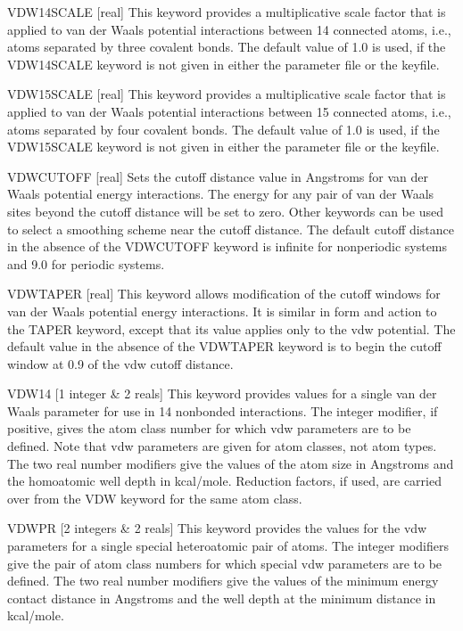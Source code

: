 \documentclass[letterpaper,11pt,english]{sphinxmanual}
\begin{document}
VDW\sphinxhyphen{}14\sphinxhyphen{}SCALE {[}real{]}     This keyword provides a multiplicative scale factor that is applied to van der Waals potential interactions between 1\sphinxhyphen{}4 connected atoms, i.e., atoms separated by three covalent bonds. The default value of 1.0 is used, if the VDW\sphinxhyphen{}14\sphinxhyphen{}SCALE keyword is not given in either the parameter file or the keyfile.

VDW\sphinxhyphen{}15\sphinxhyphen{}SCALE {[}real{]}     This keyword provides a multiplicative scale factor that is applied to van der Waals potential interactions between 1\sphinxhyphen{}5 connected atoms, i.e., atoms separated by four covalent bonds. The default value of 1.0 is used, if the VDW\sphinxhyphen{}15\sphinxhyphen{}SCALE keyword is not given in either the parameter file or the keyfile.

VDW\sphinxhyphen{}CUTOFF {[}real{]}     Sets the cutoff distance value in Angstroms for van der Waals potential energy interactions. The energy for any pair of van der Waals sites beyond the cutoff distance will be set to zero. Other keywords can be used to select a smoothing scheme near the cutoff distance. The default cutoff distance in the absence of the VDW\sphinxhyphen{}CUTOFF keyword is infinite for nonperiodic systems and 9.0 for periodic systems.

VDW\sphinxhyphen{}TAPER {[}real{]}     This keyword allows modification of the cutoff windows for van der Waals potential energy interactions. It is similar in form and action to the TAPER keyword, except that its value applies only to the vdw potential. The default value in the absence of the VDW\sphinxhyphen{}TAPER keyword is to begin the cutoff window at 0.9 of the vdw cutoff distance.

VDW14 {[}1 integer \& 2 reals{]}     This keyword provides values for a single van der Waals parameter for use in 1\sphinxhyphen{}4 nonbonded interactions. The integer modifier, if positive, gives the atom class number for which vdw parameters are to be defined. Note that vdw parameters are given for atom classes, not atom types. The two real number modifiers give the values of the atom size in Angstroms and the homoatomic well depth in kcal/mole. Reduction factors, if used, are carried over from the VDW keyword for the same atom class.

VDWPR {[}2 integers \& 2 reals{]}     This keyword provides the values for the vdw parameters for a single special heteroatomic pair of atoms. The integer modifiers give the pair of atom class numbers for which special vdw parameters are to be defined. The two real number modifiers give the values of the minimum energy contact distance in Angstroms and the well depth at the minimum distance in kcal/mole.
\end{document}
